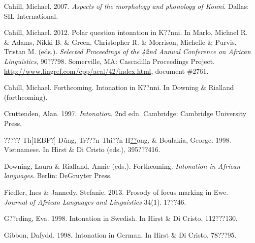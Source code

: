 \documentclass[output=paper]{langsci/langscibook}
\begin{document}
\begin{styleBibliographyiv}
Cahill, Michael. 2007. \emph{Aspects of the morphology and phonology of Konni}. Dallas: SIL International.
\end{styleBibliographyiv}

\begin{styleBibliographyiv}
Cahill, Michael. 2012. Polar question intonation in K??nni. In Marlo, Michael R. \& Adams, Nikki B. \& Green, Christopher R. \& Morrison, Michelle \& Purvis,\emph{ }Tristan M. (eds.). \emph{Selected Proceedings of the 42nd Annual Conference on African Linguistics}, 90???98. Somerville, MA: Cascadilla Proceedings Project. \url{http://www.lingref.com/cpp/acal/42/index.html}, document \#2761.
\end{styleBibliographyiv}

\begin{styleReferences}
Cahill, Michael. Forthcoming. Intonation in K??nni. In Downing \& Rialland (forthcoming).
\end{styleReferences}

\begin{styleReferences}
Cruttenden, Alan. 1997. \emph{Intonation}. 2nd edn. Cambridge: Cambridge University Press.
\end{styleReferences}

\begin{styleReferences}
????? Th[1EBF?] D\~{u}ng, Tr???n Thi??n H\href{http://en.wikipedia.org/wiki/??}{??}ong, \& Boulakia, George. 1998. Vietnamese. In Hirst \& Di Cristo (eds.), 395???416.
\end{styleReferences}

\begin{styleBibliographyiv}
Downing, Laura \& Rialland, Annie (eds.). Forthcoming. \emph{Intonation in African languages}. Berlin: DeGruyter Press.
\end{styleBibliographyiv}

\begin{styleBibliographyiv}
Fiedler, Ines \& Jannedy, Stefanie. 2013. Prosody of focus marking in Ewe. \emph{Journal of African Languages and Linguistics}\textit{ }34(1). 1???46.
\end{styleBibliographyiv}

\begin{styleBibliographyiv}
G??rding, Eva. 1998. Intonation in Swedish. In Hirst \& Di Cristo, 112???130. 
\end{styleBibliographyiv}

\begin{styleBibliographyiv}
Gibbon, Dafydd. 1998. Intonation in German. In Hirst \& Di Cristo, 78???95.
\end{styleBibliographyiv}
\end{document}
